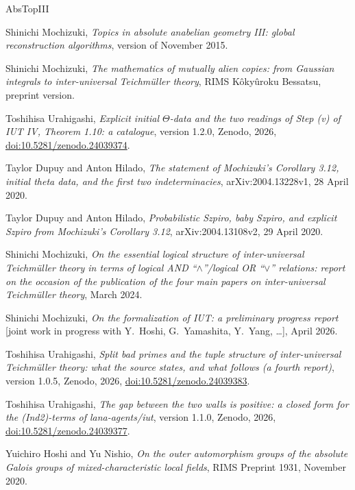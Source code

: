 \documentclass[11pt,a4paper]{article}
\theoremstyle{plain}
\theoremstyle{definition}
\theoremstyle{remark}
\begin{document}
\begin{thebibliography}{AbsTopIII}\raggedright
{}
Shinichi Mochizuki, \emph{Topics in absolute anabelian geometry III: global reconstruction algorithms}, version of
November 2015.

Shinichi Mochizuki, \emph{The mathematics of mutually alien copies: from Gaussian integrals to inter-universal
Teichm\"uller theory}, RIMS K\^oky\^uroku Bessatsu, preprint version.

Toshihisa Urahigashi, \emph{Explicit initial $\Theta$-data and the two readings of Step (v) of IUT IV, Theorem 1.10:
a catalogue}, version 1.2.0, Zenodo, 2026, \href{https://doi.org/10.5281/zenodo.24039374}{doi:10.5281/zenodo.24039374}.

Taylor Dupuy and Anton Hilado, \emph{The statement of Mochizuki's Corollary 3.12, initial theta data, and the first two
indeterminacies}, arXiv:2004.13228v1, 28 April 2020.

Taylor Dupuy and Anton Hilado, \emph{Probabilistic Szpiro, baby Szpiro, and explicit Szpiro from Mochizuki's
Corollary 3.12}, arXiv:2004.13108v2, 29 April 2020.

Shinichi Mochizuki, \emph{On the essential logical structure of inter-universal Teichm\"uller theory in terms of
logical AND ``$\wedge$''/logical OR ``$\vee$'' relations: report on the occasion of the publication of the four main
papers on inter-universal Teichm\"uller theory}, March 2024.

Shinichi Mochizuki, \emph{On the formalization of IUT: a preliminary progress report} [joint work in progress with
Y.~Hoshi, G.~Yamashita, Y.~Yang, \dots], April 2026.

Toshihisa Urahigashi, \emph{Split bad primes and the tuple structure of inter-universal Teichm\"uller theory: what the
source states, and what follows (a fourth report)}, version 1.0.5, Zenodo, 2026,
\href{https://doi.org/10.5281/zenodo.24039383}{doi:10.5281/zenodo.24039383}.

Toshihisa Urahigashi, \emph{The gap between the two walls is positive: a closed form for the (Ind2)-terms of
lana-agents/iut}, version 1.1.0, Zenodo, 2026,
\href{https://doi.org/10.5281/zenodo.24039377}{doi:10.5281/zenodo.24039377}.

Yuichiro Hoshi and Yu Nishio, \emph{On the outer automorphism groups of the absolute Galois groups of
mixed-characteristic local fields}, RIMS Preprint 1931, November 2020.


\end{thebibliography}
\end{document}
